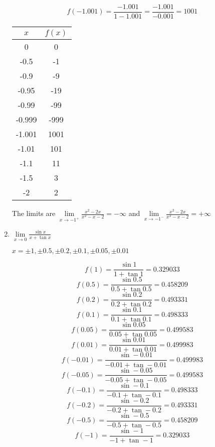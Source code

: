\documentclass{article}
\begin{document}
\begin{enumerate}
				$$f(-1.001) = \frac{-1.001}{1-1.001} = \frac{-1.001}{-0.001} = 1001$$
				
				\begin{center}
				\begin{tabular}{|c|c|}
					\hline
					$x$ & $f(x)$ \\
					\hline \hline
					0 & 0 \\
					-0.5 & -1 \\
					-0.9 & -9 \\
					-0.95 & -19 \\
					-0.99 & -99 \\
					-0.999 & -999 \\
					-1.001 & 1001 \\
					-1.01 & 101 \\
					-1.1 & 11 \\
					-1.5 & 3 \\
					-2 & 2 \\
					\hline
				\end{tabular}
				\end{center}
				
				The limits are $\lim \limits _{x \to -1^{+}}  \frac{x^2 - 2x}{x^2 - x - 2} = -\infty$ and
				$\lim \limits _{x \to -1^{-}} \frac{x^2 - 2x}{x^2 - x - 2} = +\infty$
				
			\item $\lim \limits _{x \to 0} \frac{\sin x}{x + \tan x}$
			
				$x = \pm 1, \pm 0.5, \pm 0.2, \pm 0.1, \pm 0.05, \pm 0.01$
				
				$$f(1) = \frac{\sin 1}{1 + \tan 1} = 0.329033$$
				$$f(0.5) = \frac{\sin 0.5}{0.5 + \tan 0.5} = 0.458209$$
				$$f(0.2) = \frac{\sin 0.2}{0.2 + \tan 0.2} = 0.493331$$
				$$f(0.1) = \frac{\sin 0.1}{0.1 + \tan 0.1} = 0.498333$$
				$$f(0.05) = \frac{\sin 0.05}{0.05 + \tan 0.05} = 0.499583$$
				$$f(0.01) = \frac{\sin 0.01}{0.01 + \tan 0.01} = 0.499983$$
				$$f(-0.01) = \frac{\sin -0.01}{-0.01 + \tan -0.01} = 0.499983$$
				$$f(-0.05) = \frac{\sin -0.05}{-0.05 + \tan -0.05} = 0.499583$$
				$$f(-0.1) = \frac{\sin - 0.1} {-0.1 + \tan -0.1} = 0.498333$$
				$$f(-0.2) = \frac{\sin -0.2}{-0.2 + \tan -0.2} = 0.493331$$
				$$f(-0.5) = \frac{\sin -0.5}{-0.5 + \tan -0.5} = 0.458209$$
				$$f(-1) = \frac{\sin -1}{-1 + \tan -1} =0.329033$$
				

\end{enumerate}
\end{document}
